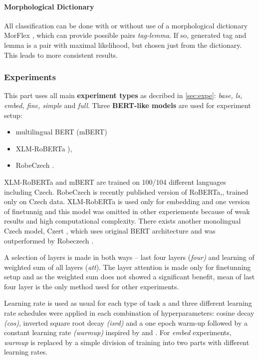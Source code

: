 

\paragraph{Morphological Dictionary} All classification can be done with or without use of a morphological dictionary MorFlex \citep{11234/1-1834}, which can provide possible pairs \textit{tag-lemma}. If so, generated tag and lemma is a pair with maximal likelihood, but chosen just from the dictionary. This leads to more consistent results. 



\subsubsection{Experiments}
This part uses all main \textbf{experiment types} as decribed in \ref{sec:expe}: \textit{base, ls, embed, fine, simple} and \textit{full}. Three \textbf{BERT-like models} are used for experiment setup:
\begin{itemize}
\item multilingual BERT (mBERT) \citep{Devlin2019} 
\item XLM-RoBERTa \citep{Conneau2019}), 
\item RobeCzech \citep{Straka2021}.
\end{itemize}
XLM-RoBERTa and mBERT are trained on 100/104 different languages including Czech. RobeCzech is recently published version of RoBERTa,, trained only on Czech data. XLM-RobERTa is used only for embedding and one version of finetunnig and this model was omitted in other experiements because of weak results and high computational complexity. There exists another monolingual Czech model, Czert \citep{Sido2021}, which uses original BERT architecture and was outperformed by Robeczech \citep{Straka2021}. \par
A selection of layers is made in both ways -- last four layers (\textit{four)} and learning of weighted sum of all layers (\textit{att}). The layer attention is made only for finetunning setup and as the weighted sum does not showed a significant benefit, mean of last four layer is the only method used for other experiments.
 \par Learning rate is used as usual for each type of task a and three different learning rate schedules were applied in each combination of hyperparameters: cosine decay \textit{(cos)}, inverted square root decay \textit{(isrd)} and a one epoch warm-up followed by a constant learning rate \textit{(warmup)} inspired by \citep{Kondratyuk2019} and \citep{Ruder2018}. For \textit{embed} experiments, \textit{warmup} is replaced by  a simple division of training into two parts with different learning rates. 
 
